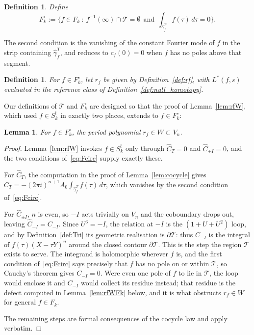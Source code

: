 \documentclass[11pt]{article}
\newtheorem{lemma}[theorem]{Lemma}
\newtheorem{definition}[theorem]{Definition}
\begin{document}
\begin{definition}\label{def:Fcirc}
Define
\begin{equation}\label{eq:Fcirc}
F_k^{\circ}:=\Big\{f\in F_k\ :\ f^{-1}(\infty)\cap\mathcal{T}=\emptyset\ \ \text{and}\ \
\int_{\hat\gamma^T_f}f(\tau)\,d\tau=0\Big\}.
\end{equation}
\end{definition}

The second condition is the vanishing of the constant Fourier mode of $f$ in the strip containing
$\hat\gamma^T_f$, and reduces to $c_f(0)=0$ when $f$ has no poles above that segment.

\begin{definition}\label{def:rfmero}
For $f\in F_k^{\circ}$, let $r_f$ be given by Definition~\ref{def:rf}, with $L^*(f,s)$ evaluated in
the reference class of Definition~\ref{def:null_homotopy}.
\end{definition}

Our definitions of $\mathcal{T}$ and $F_k^\circ$ are designed so that the proof of
Lemma~\ref{lem:rfW}, which used $f\in S^!_k$ in exactly two places, extends to $f\in F_k^\circ$:

\begin{lemma}\label{lem:rfWmero}
For $f\in F_k^{\circ}$, the period polynomial $r_f\in W\subset V_n$.
\end{lemma}
\begin{proof}
Lemma~\ref{lem:rfW} invokes $f\in S^!_k$ only through $\hat C_T=0$ and $\hat C_{\pm I}=0$, and the
two conditions of~\eqref{eq:Fcirc} supply exactly these.

For $\hat C_T$, the computation in the proof of Lemma~\ref{lem:cocycle} gives
$\hat C_T=-(2\pi i)^{n+1}A_0\int_{\hat\gamma^T_f}f(\tau)\,d\tau$, which vanishes by the second
condition of~\eqref{eq:Fcirc}.

For $\hat C_{\pm I}$, $n$ is even, so $-I$ acts trivially on $V_n$ and the coboundary drops out,
leaving $\hat C_{-I}=C_{-I}$. Since $U^3=-I$, the relation at $-I$ is the $(1+U+U^2)$ loop, and by
Definition~\ref{def:Tri} its geometric realisation is $\partial\mathcal{T}$: thus $C_{-I}$ is the
integral of $f(\tau)(X-\tau Y)^{n}$ around the closed contour $\partial\mathcal{T}$. This is the
step the region $\mathcal{T}$ exists to serve. The integrand is holomorphic wherever $f$ is, and the
first condition of~\eqref{eq:Fcirc} says precisely that $f$ has no pole on or within $\mathcal{T}$,
so Cauchy's theorem gives $C_{-I}=0$. Were even one pole of $f$ to lie in $\mathcal{T}$, the loop
would enclose it and $C_{-I}$ would collect its residue instead; that residue is the defect computed
in Lemma~\ref{lem:rfWFk} below, and it is what obstructs $r_f\in W$ for general $f\in F_k$.

The remaining steps are formal consequences of the cocycle law and apply verbatim.
\end{proof}
\end{document}
